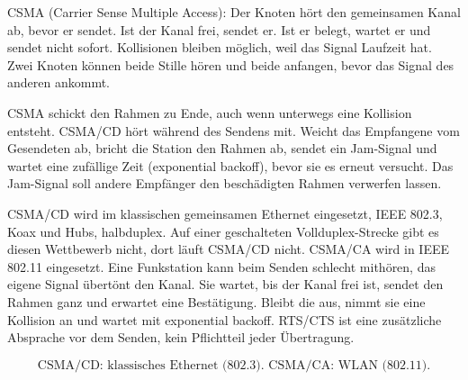 \documentclass[a4paper,11pt]{article}
\newif\ifexplain
\newcommand{\explain}[1]{\ifexplain\begin{erklbox}#1\end{erklbox}\fi}
\begin{document}
CSMA (Carrier Sense Multiple Access): Der Knoten hört den gemeinsamen Kanal ab, bevor er sendet. Ist der Kanal frei, sendet er. Ist er belegt, wartet er und sendet nicht sofort. Kollisionen bleiben möglich, weil das Signal Laufzeit hat. Zwei Knoten können beide Stille hören und beide anfangen, bevor das Signal des anderen ankommt.

CSMA schickt den Rahmen zu Ende, auch wenn unterwegs eine Kollision entsteht. CSMA/CD hört während des Sendens mit. Weicht das Empfangene vom Gesendeten ab, bricht die Station den Rahmen ab, sendet ein Jam-Signal und wartet eine zufällige Zeit (exponential backoff), bevor sie es erneut versucht. Das Jam-Signal soll andere Empfänger den beschädigten Rahmen verwerfen lassen.

CSMA/CD wird im klassischen gemeinsamen Ethernet eingesetzt, IEEE 802.3, Koax und Hubs, halbduplex. Auf einer geschalteten Vollduplex-Strecke gibt es diesen Wettbewerb nicht, dort läuft CSMA/CD nicht. CSMA/CA wird in IEEE 802.11 eingesetzt. Eine Funkstation kann beim Senden schlecht mithören, das eigene Signal übertönt den Kanal. Sie wartet, bis der Kanal frei ist, sendet den Rahmen ganz und erwartet eine Bestätigung. Bleibt die aus, nimmt sie eine Kollision an und wartet mit exponential backoff. RTS/CTS ist eine zusätzliche Absprache vor dem Senden, kein Pflichtteil jeder Übertragung.

\explain{Die Frage trennt drei Dinge. CSMA ist das Abhören vor dem Senden. CD ist das Abbrechen während des Sendens, das geht auf einem gemeinsamen Kupfersegment. CA ist das Vermeiden vor dem Senden, das braucht WLAN, weil Mithören beim Senden dort schlecht geht. Wer CD und CA vertauscht, nennt beim Ethernet die falsche Reaktion: WLAN bricht den Rahmen nicht mitten im Senden ab.}

\[
\boxed{\text{CSMA/CD: klassisches Ethernet (802.3). CSMA/CA: WLAN (802.11).}}
\]
\end{document}
